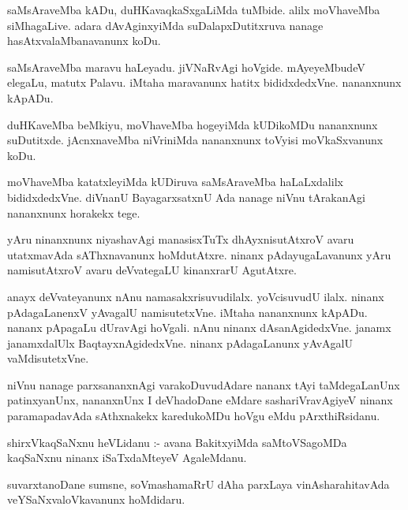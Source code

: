 \documentclass{article}
\begin{document}
\begin{mn}
saMsAraveMba kADu, duHKavaqkaSxgaLiMda tuMbide.  alilx moVhaveMba siMhagaLive.  
adara dAvAginxyiMda suDalapxDutitxruva nanage hasAtxvalaMbanavanunx koDu.
\end{mn}

\begin{mn}
saMsAraveMba maravu haLeyadu.  jiVNaRvAgi hoVgide. mAyeyeMbudeV  elegaLu, 
matutx Palavu.  iMtaha maravanunx hatitx bididxdedxVne.  nananxnunx kApADu.
\end{mn}

\begin{mn}
duHKaveMba beMkiyu, moVhaveMba hogeyiMda kUDikoMDu nananxnunx suDutitxde.  
jAcnxnaveMba niVriniMda nananxnunx toVyisi moVkaSxvanunx koDu.
\end{mn}

\begin{mn}
moVhaveMba katatxleyiMda kUDiruva saMsAraveMba  haLaLxdalilx bididxdedxVne.  
diVnanU BayagarxsatxnU Ada nanage niVnu  tArakanAgi nananxnunx horakekx tege.
\end{mn}

\begin{mn}
yAru ninanxnunx niyashavAgi  manasisxTuTx  dhAyxnisutAtxroV avaru utatxmavAda 
sAThxnavanunx  hoMdutAtxre.  ninanx pAdayugaLavanunx yAru namisutAtxroV 
avaru deVvategaLU  kinanxrarU AgutAtxre. 
\end{mn}

\begin{mn}
anayx deVvateyanunx nAnu namasakxrisuvudilalx. yoVcisuvudU ilalx.  ninanx 
pAdagaLanenxV yAvagalU namisutetxVne. iMtaha nananxnunx kApADu.  nananx 
pApagaLu dUravAgi hoVgali.  nAnu ninanx dAsanAgidedxVne. janamx janamxdalUlx 
BaqtayxnAgidedxVne.  ninanx pAdagaLanunx yAvAgalU vaMdisutetxVne.
\end{mn}

\begin{mn}
niVnu nanage parxsananxnAgi varakoDuvudAdare  nananx tAyi taMdegaLanUnx 
patinxyanUnx, nananxnUnx  I deVhadoDane eMdare sashariVravAgiyeV ninanx 
paramapadavAda sAthxnakekx karedukoMDu hoVgu eMdu pArxthiRsidanu. 
\end{mn}

\begin{mn}
shirxVkaqSaNxnu heVLidanu :- avana BakitxyiMda saMtoVSagoMDa kaqSaNxnu 
ninanx iSaTxdaMteyeV AgaleMdanu.
\end{mn}

\begin{mn}
suvarxtanoDane sumsne, soVmashamaRrU dAha parxLaya vinAsharahitavAda 
veYSaNxvaloVkavanunx  hoMdidaru.
\end{mn}
\end{document}
